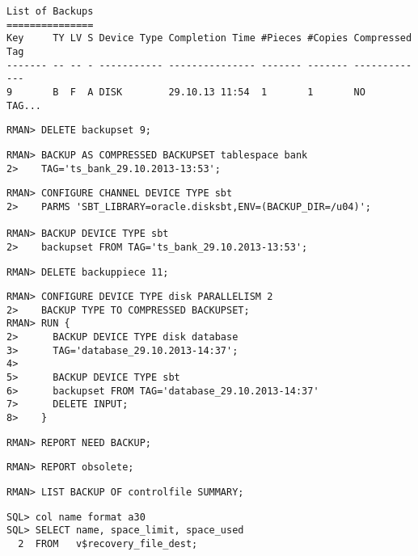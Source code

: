\begin{enumerate}
\begin{lstlisting}[language=rman]
List of Backups
===============
Key     TY LV S Device Type Completion Time #Pieces #Copies Compressed Tag
------- -- -- - ----------- --------------- ------- ------- ---------- ---
9       B  F  A DISK        29.10.13 11:54  1       1       NO         TAG...

    \end{lstlisting}
    
    \begin{lstlisting}[language=rman]
RMAN> DELETE backupset 9;
    \end{lstlisting}
    
    \begin{lstlisting}[language=rman]
RMAN> BACKUP AS COMPRESSED BACKUPSET tablespace bank
2>    TAG='ts_bank_29.10.2013-13:53';
    \end{lstlisting}
    
    \begin{lstlisting}[language=rman]
RMAN> CONFIGURE CHANNEL DEVICE TYPE sbt
2>    PARMS 'SBT_LIBRARY=oracle.disksbt,ENV=(BACKUP_DIR=/u04)';

RMAN> BACKUP DEVICE TYPE sbt
2>    backupset FROM TAG='ts_bank_29.10.2013-13:53';
    \end{lstlisting}
    
    \begin{lstlisting}[language=rman]
RMAN> DELETE backuppiece 11;
    \end{lstlisting}
\clearpage
    
    \begin{lstlisting}[language=rman]
RMAN> CONFIGURE DEVICE TYPE disk PARALLELISM 2
2>    BACKUP TYPE TO COMPRESSED BACKUPSET;
RMAN> RUN {
2>      BACKUP DEVICE TYPE disk database
3>      TAG='database_29.10.2013-14:37';
4>
5>      BACKUP DEVICE TYPE sbt
6>      backupset FROM TAG='database_29.10.2013-14:37'
7>      DELETE INPUT;
8>    }
    \end{lstlisting}
    
    \begin{lstlisting}[language=rman]
RMAN> REPORT NEED BACKUP;
    \end{lstlisting}
    
    \begin{lstlisting}[language=rman]
RMAN> REPORT obsolete;
    \end{lstlisting}
    
    \begin{lstlisting}[language=rman]
RMAN> LIST BACKUP OF controlfile SUMMARY;
    \end{lstlisting}	
    
    \begin{lstlisting}[language=oracle_sql]
SQL> col name format a30
SQL> SELECT name, space_limit, space_used
  2  FROM   v$recovery_file_dest;


\end{lstlisting}
\end{enumerate}
